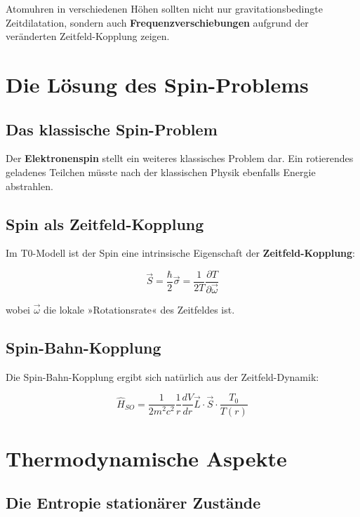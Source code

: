 \documentclass[12pt,a4paper]{report}
\begin{document}
	Atomuhren in verschiedenen Höhen sollten nicht nur gravitationsbedingte Zeitdilatation, sondern auch \textbf{Frequenzverschiebungen} aufgrund der veränderten Zeitfeld-Kopplung zeigen.
	
	\section{Die Lösung des Spin-Problems}
	
	\subsection{Das klassische Spin-Problem}
	
	Der \textbf{Elektronenspin} stellt ein weiteres klassisches Problem dar. Ein rotierendes geladenes Teilchen müsste nach der klassischen Physik ebenfalls Energie abstrahlen.
	
	\subsection{Spin als Zeitfeld-Kopplung}
	
	Im T0-Modell ist der Spin eine intrinsische Eigenschaft der \textbf{Zeitfeld-Kopplung}:
	
	\begin{equation}
		\vec{S} = \frac{\hbar}{2}\vec{\sigma} = \frac{1}{2T}\frac{\partial T}{\partial \vec{\omega}}
	\end{equation}
	
	wobei $\vec{\omega}$ die lokale »Rotationsrate« des Zeitfeldes ist.
	
	\subsection{Spin-Bahn-Kopplung}
	
	Die Spin-Bahn-Kopplung ergibt sich natürlich aus der Zeitfeld-Dynamik:
	
	\begin{equation}
		\hat{H}_{SO} = \frac{1}{2m^2c^2}\frac{1}{r}\frac{dV}{dr}\vec{L} \cdot \vec{S} \cdot \frac{T_0}{T(r)}
	\end{equation}
	
	\section{Thermodynamische Aspekte}
	
	\subsection{Die Entropie stationärer Zustände}
	
\end{document}

